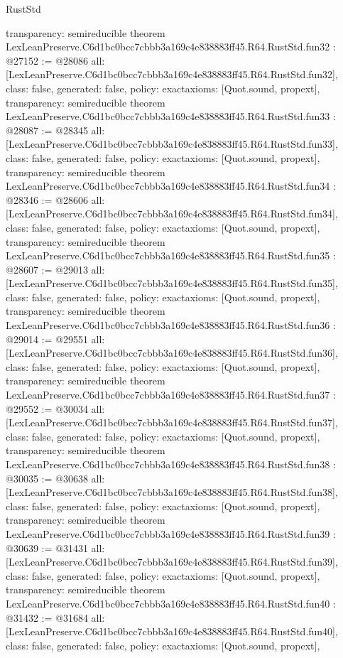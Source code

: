 \begin{lexlean}{RustStd}
\begin{coremodule}
{  transparency: semireducible
}
theorem LexLeanPreserve.C6d1bc0bcc7cbbb3a169c4e838883ff45.R64.RustStd.fun32 : @27152 := @28086 {
  all: [LexLeanPreserve.C6d1bc0bcc7cbbb3a169c4e838883ff45.R64.RustStd.fun32],
  class: false,
  generated: false,
  policy: exact{axioms: [Quot.sound, propext]},
  transparency: semireducible
}
theorem LexLeanPreserve.C6d1bc0bcc7cbbb3a169c4e838883ff45.R64.RustStd.fun33 : @28087 := @28345 {
  all: [LexLeanPreserve.C6d1bc0bcc7cbbb3a169c4e838883ff45.R64.RustStd.fun33],
  class: false,
  generated: false,
  policy: exact{axioms: [Quot.sound, propext]},
  transparency: semireducible
}
theorem LexLeanPreserve.C6d1bc0bcc7cbbb3a169c4e838883ff45.R64.RustStd.fun34 : @28346 := @28606 {
  all: [LexLeanPreserve.C6d1bc0bcc7cbbb3a169c4e838883ff45.R64.RustStd.fun34],
  class: false,
  generated: false,
  policy: exact{axioms: [Quot.sound, propext]},
  transparency: semireducible
}
theorem LexLeanPreserve.C6d1bc0bcc7cbbb3a169c4e838883ff45.R64.RustStd.fun35 : @28607 := @29013 {
  all: [LexLeanPreserve.C6d1bc0bcc7cbbb3a169c4e838883ff45.R64.RustStd.fun35],
  class: false,
  generated: false,
  policy: exact{axioms: [Quot.sound, propext]},
  transparency: semireducible
}
theorem LexLeanPreserve.C6d1bc0bcc7cbbb3a169c4e838883ff45.R64.RustStd.fun36 : @29014 := @29551 {
  all: [LexLeanPreserve.C6d1bc0bcc7cbbb3a169c4e838883ff45.R64.RustStd.fun36],
  class: false,
  generated: false,
  policy: exact{axioms: [Quot.sound, propext]},
  transparency: semireducible
}
theorem LexLeanPreserve.C6d1bc0bcc7cbbb3a169c4e838883ff45.R64.RustStd.fun37 : @29552 := @30034 {
  all: [LexLeanPreserve.C6d1bc0bcc7cbbb3a169c4e838883ff45.R64.RustStd.fun37],
  class: false,
  generated: false,
  policy: exact{axioms: [Quot.sound, propext]},
  transparency: semireducible
}
theorem LexLeanPreserve.C6d1bc0bcc7cbbb3a169c4e838883ff45.R64.RustStd.fun38 : @30035 := @30638 {
  all: [LexLeanPreserve.C6d1bc0bcc7cbbb3a169c4e838883ff45.R64.RustStd.fun38],
  class: false,
  generated: false,
  policy: exact{axioms: [Quot.sound, propext]},
  transparency: semireducible
}
theorem LexLeanPreserve.C6d1bc0bcc7cbbb3a169c4e838883ff45.R64.RustStd.fun39 : @30639 := @31431 {
  all: [LexLeanPreserve.C6d1bc0bcc7cbbb3a169c4e838883ff45.R64.RustStd.fun39],
  class: false,
  generated: false,
  policy: exact{axioms: [Quot.sound, propext]},
  transparency: semireducible
}
theorem LexLeanPreserve.C6d1bc0bcc7cbbb3a169c4e838883ff45.R64.RustStd.fun40 : @31432 := @31684 {
  all: [LexLeanPreserve.C6d1bc0bcc7cbbb3a169c4e838883ff45.R64.RustStd.fun40],
  class: false,
  generated: false,
  policy: exact{axioms: [Quot.sound, propext]},
}
\end{coremodule}
\end{lexlean}
